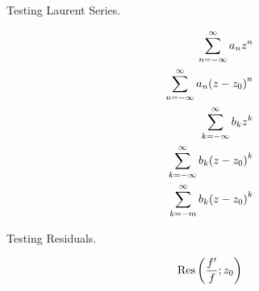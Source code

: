 \documentclass[12pt]{report}
\begin{document}
	
Testing Laurent Series.
	
\begin{align*}
\LaurentSeriesBasic \\
\LaurentSeriesVar{(z-z_0)} \\
\LaurentSeriesCoef{b}{k} \\
\LaurentSeries{(z-z_0)}{b}{k} \\
\LaurentSeriesIndexed{(z-z_0)}{b}{k}{-m}
\end{align*} 

Testing Residuals.

\begin{align*}
	\Residual{\frac{f'}{f}}{z_0}
\end{align*}
\end{document}

